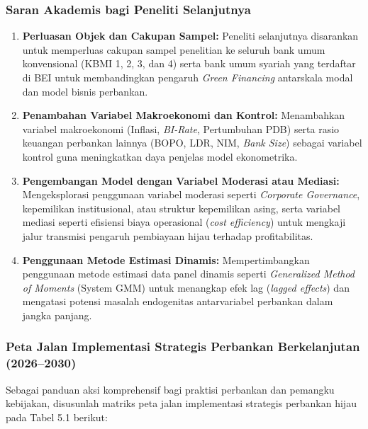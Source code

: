 \documentclass[12pt,a4paper]{article}
\numberwithin{equation}{section}
\begin{document}
\subsubsection{Saran Akademis bagi Peneliti Selanjutnya}
\begin{enumerate}[label=\alph*.]
  \item \textbf{Perluasan Objek dan Cakupan Sampel:} Peneliti selanjutnya disarankan untuk memperluas cakupan sampel penelitian ke seluruh bank umum konvensional (KBMI 1, 2, 3, dan 4) serta bank umum syariah yang terdaftar di BEI untuk membandingkan pengaruh \emph{Green Financing} antarskala modal dan model bisnis perbankan.
  \item \textbf{Penambahan Variabel Makroekonomi dan Kontrol:} Menambahkan variabel makroekonomi (Inflasi, \emph{BI-Rate}, Pertumbuhan PDB) serta rasio keuangan perbankan lainnya (BOPO, LDR, NIM, \emph{Bank Size}) sebagai variabel kontrol guna meningkatkan daya penjelas model ekonometrika.
  \item \textbf{Pengembangan Model dengan Variabel Moderasi atau Mediasi:} Mengeksplorasi penggunaan variabel moderasi seperti \emph{Corporate Governance}, kepemilikan institusional, atau struktur kepemilikan asing, serta variabel mediasi seperti efisiensi biaya operasional (\emph{cost efficiency}) untuk mengkaji jalur transmisi pengaruh pembiayaan hijau terhadap profitabilitas.
  \item \textbf{Penggunaan Metode Estimasi Dinamis:} Mempertimbangkan penggunaan metode estimasi data panel dinamis seperti \emph{Generalized Method of Moments} (System GMM) untuk menangkap efek lag (\emph{lagged effects}) dan mengatasi potensi masalah endogenitas antarvariabel perbankan dalam jangka panjang.
\end{enumerate}

\subsubsection{Peta Jalan Implementasi Strategis Perbankan Berkelanjutan (2026--2030)}
\noindent
Sebagai panduan aksi komprehensif bagi praktisi perbankan dan pemangku kebijakan, disusunlah matriks peta jalan implementasi strategis perbankan hijau pada Tabel 5.1 berikut:
\end{document}
